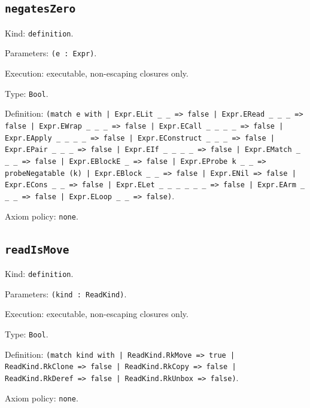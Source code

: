 \documentclass[11pt]{article}
\begin{document}
\subsection*{\texttt{negatesZero}}
\noindent Kind: \texttt{definition}.\par
\noindent Parameters: \texttt{(e : Expr)}.\par
\noindent Execution: executable, non-escaping closures only.\par
\noindent Type: \texttt{Bool}.\par
\noindent Definition: \texttt{(match e with | Expr.ELit \_ \_ => false | Expr.ERead \_ \_ \_ => false | Expr.EWrap \_ \_ \_ => false | Expr.ECall \_ \_ \_ \_ => false | Expr.EApply \_ \_ \_ \_ => false | Expr.EConstruct \_ \_ \_ => false | Expr.EPair \_ \_ \_ => false | Expr.EIf \_ \_ \_ \_ => false | Expr.EMatch \_ \_ \_ => false | Expr.EBlockE \_ => false | Expr.EProbe k \_ \_ => probeNegatable (k) | Expr.EBlock \_ \_ => false | Expr.ENil => false | Expr.ECons \_ \_ => false | Expr.ELet \_ \_ \_ \_ \_ \_ => false | Expr.EArm \_ \_ \_ => false | Expr.ELoop \_ \_ => false)}.\par
\noindent Axiom policy: \texttt{none}.\par
\subsection*{\texttt{readIsMove}}
\noindent Kind: \texttt{definition}.\par
\noindent Parameters: \texttt{(kind : ReadKind)}.\par
\noindent Execution: executable, non-escaping closures only.\par
\noindent Type: \texttt{Bool}.\par
\noindent Definition: \texttt{(match kind with | ReadKind.RkMove => true | ReadKind.RkClone => false | ReadKind.RkCopy => false | ReadKind.RkDeref => false | ReadKind.RkUnbox => false)}.\par
\noindent Axiom policy: \texttt{none}.\par
\end{document}
